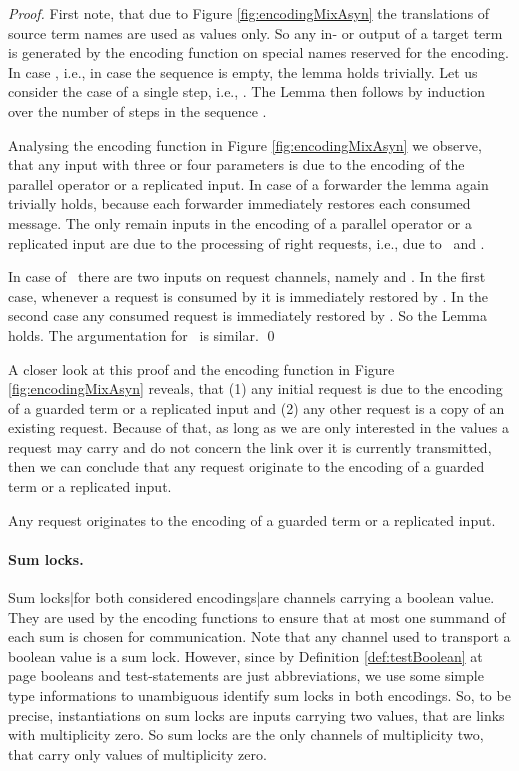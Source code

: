 \documentclass[]{llncs}
\begin{document}
\begin{proof}
	First note, that due to Figure \ref{fig:encodingMixAsyn} the translations of source term names are used as values only. So any in- or output of a target term is generated by the encoding function on special names reserved for the encoding. In case , i.e., in case the sequence  is empty, the lemma holds trivially. Let us consider the case of a single step, i.e., . The Lemma then follows by induction over the number of steps in the sequence .
	
	Analysing the encoding function in Figure \ref{fig:encodingMixAsyn} we observe, that any input with three or four parameters is due to the encoding of the parallel operator or a replicated input. In case of a forwarder the lemma again trivially holds, because each forwarder immediately restores each consumed message. The only remain inputs in the encoding of a parallel operator or a replicated input are due to the processing of right requests, i.e., due to \processRightOutputRequests \ and \processRightInputRequests.
	
	In case of \processRightOutputRequests \ there are two inputs on request channels, namely  and . In the first case, whenever a request is consumed by  it is immediately restored by . In the second case any consumed request is immediately restored by . So the Lemma holds. The argumentation for \processRightInputRequests \ is similar.
	\qed
\end{proof}

A closer look at this proof and the encoding function in Figure \ref{fig:encodingMixAsyn} reveals, that (1) any initial request is due to the encoding of a guarded term or a replicated input and (2) any other request is a copy of an existing request. Because of that, as long as we are only interested in the values a request may carry and do not concern the link over it is currently transmitted, then we can conclude that any request originate to the encoding of a guarded term or a replicated input.
\begin{corollary} \label{col:originRequests}
	Any request originates to the encoding of a guarded term or a replicated input.
\end{corollary}

\paragraph*{Sum locks.} Sum locks|for both considered encodings|are channels carrying a boolean value. They are used by the encoding functions to ensure that at most one summand of each sum is chosen for communication. Note that any channel used to transport a boolean value is a sum lock. However, since by Definition \ref{def:testBoolean} at page \pageref{def:testBoolean} booleans and test-statements are just abbreviations, we use some simple type informations to unambiguous identify sum locks in both encodings. So, to be precise, instantiations on sum locks are inputs carrying two values, that are links with multiplicity zero. So sum locks are the only channels of multiplicity two, that carry only values of multiplicity zero.
\end{document}

